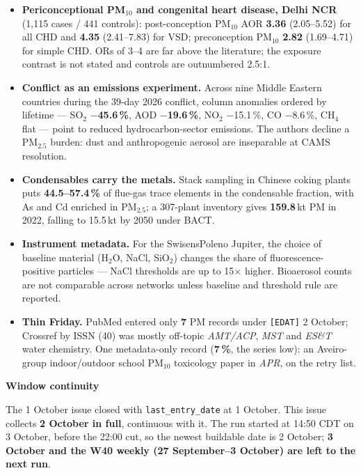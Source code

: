 \documentclass[10pt]{article}
\begin{document}
\footnotesize
\begin{itemize}

\item \textbf{Periconceptional PM$_{10}$ and congenital heart disease, Delhi NCR} (1,115 cases / 441 controls):
post-conception PM$_{10}$ AOR \textbf{3.36} (2.05--5.52) for all CHD and \textbf{4.35} (2.41--7.83) for VSD;
preconception PM$_{10}$ \textbf{2.82} (1.69--4.71) for simple CHD. ORs of 3--4 are far above the
literature; the exposure contrast is not stated and controls are outnumbered 2.5:1.

\item \textbf{Conflict as an emissions experiment.} Across nine Middle Eastern countries during the 39-day
2026 conflict, column anomalies ordered by lifetime --- SO$_2$ \textbf{$-$45.6\,\%}, AOD \textbf{$-$19.6\,\%},
NO$_2$ $-$15.1\,\%, CO $-$8.6\,\%, CH$_4$ flat --- point to reduced hydrocarbon-sector emissions. The authors
decline a PM$_{2.5}$ burden: dust and anthropogenic aerosol are inseparable at CAMS resolution.

\item \textbf{Condensables carry the metals.} Stack sampling in Chinese coking plants puts \textbf{44.5--57.4\,\%}
of flue-gas trace elements in the condensable fraction, with As and Cd enriched in PM$_{2.5}$; a 307-plant
inventory gives \textbf{159.8}\,kt PM in 2022, falling to 15.5\,kt by 2050 under BACT.

\item \textbf{Instrument metadata.} For the SwisensPoleno Jupiter, the choice of baseline material (H$_2$O, NaCl,
SiO$_2$) changes the share of fluorescence-positive particles --- NaCl thresholds are up to 15$\times$ higher.
Bioaerosol counts are not comparable across networks unless baseline and threshold rule are reported.

\item \textbf{Thin Friday.} PubMed entered only \textbf{7} PM records under \texttt{[EDAT]} 2 October; Crossref by
ISSN (40) was mostly off-topic \textit{AMT/ACP}, \textit{MST} and \textit{ES\&T} water chemistry. One
metadata-only record (\textbf{7\,\%}, the series low): an Aveiro-group indoor/outdoor school PM$_{10}$
toxicology paper in \textit{APR}, on the retry list.

\end{itemize}

\vspace{2mm}

\begin{keybox}
{\sffamily\bfseries\footnotesize\color{Deep}Window continuity}\\[1.2mm]
{\fontsize{7.2}{8.8}\selectfont
The 1 October issue closed with \texttt{last\_entry\_date} at 1 October. This issue collects
\textbf{2 October in full}, continuous with it. The run started at 14:50 CDT on 3 October, before the 22:00
cut, so the newest buildable date is 2 October; \textbf{3 October and the W40 weekly (27 September--3 October)
are left to the next run}.\par}
\end{keybox}
\end{document}
